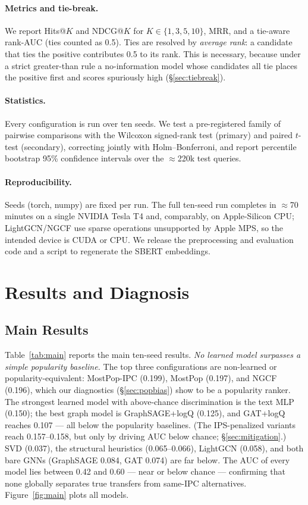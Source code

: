 \documentclass[preprint,12pt]{elsarticle}
\begin{document}
\paragraph{Metrics and tie-break.} We report Hits@$K$ and NDCG@$K$ for
$K\in\{1,3,5,10\}$, MRR, and a tie-aware rank-AUC (ties counted as 0.5). Ties are
resolved by \emph{average rank}: a candidate that ties the positive contributes 0.5
to its rank. This is necessary, because under a strict greater-than rule a no-information
model whose candidates all tie places the positive first and scores
spuriously high (\S\ref{sec:tiebreak}).

\paragraph{Statistics.} Every configuration is run over ten seeds. We test a
pre-registered family of pairwise comparisons with the Wilcoxon signed-rank test
(primary) and paired $t$-test (secondary), correcting jointly with Holm--Bonferroni,
and report percentile bootstrap 95\% confidence intervals over the $\approx$220k test
queries.

\paragraph{Reproducibility.} Seeds (torch, numpy) are fixed per run. The full
ten-seed run completes in $\approx$70 minutes on a single NVIDIA Tesla T4 and,
comparably, on Apple-Silicon CPU; LightGCN/NGCF use sparse operations unsupported by
Apple MPS, so the intended device is CUDA or CPU. We release the preprocessing and
evaluation code and a script to regenerate the SBERT embeddings.

\section{Results and Diagnosis}
\label{sec:results}

\subsection{Main Results}
\label{sec:main}
Table~\ref{tab:main} reports the main ten-seed results. \emph{No learned model
surpasses a simple popularity baseline.} The top three configurations are non-learned
or popularity-equivalent: MostPop-IPC (0.199), MostPop (0.197), and NGCF (0.196),
which our diagnostics (\S\ref{sec:popbias}) show to be a popularity ranker. The
strongest learned model with above-chance discrimination is the text MLP (0.150); the
best graph model is GraphSAGE+logQ (0.125), and GAT+logQ reaches 0.107 --- all below
the popularity baselines. (The IPS-penalized variants reach 0.157--0.158, but only by
driving AUC below chance; \S\ref{sec:mitigation}.) SVD (0.037), the structural
heuristics (0.065--0.066), LightGCN (0.058), and both bare GNNs (GraphSAGE 0.084, GAT
0.074) are far below. The AUC of every model lies between 0.42 and 0.60 --- near or
below chance --- confirming that none globally separates true transfers from same-IPC
alternatives. Figure~\ref{fig:main} plots all models.
\end{document}
